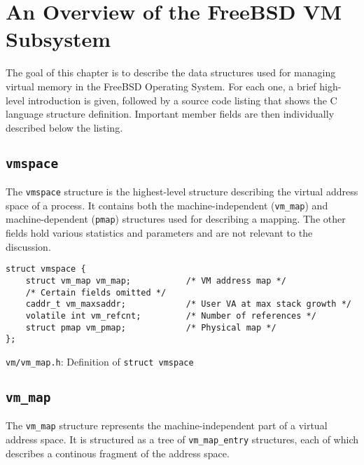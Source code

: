 \documentclass[shortabstract, english]{iithesis}
\begin{document}
\chapter{An Overview of the FreeBSD VM Subsystem}

The goal of this chapter is to describe the data structures used for managing
virtual memory in the FreeBSD Operating System. For each one, a brief high-level
introduction is given, followed by a source code listing that shows the C
language structure definition. Important member fields are then individually
described below the listing.

\section{\texttt{vmspace}}

The \texttt{vmspace} structure is the highest-level structure describing the
virtual address space of a process. It contains both the machine-independent
(\texttt{vm_map}) and machine-dependent (\texttt{pmap}) structures used for
describing a mapping. The other fields hold various statistics and parameters
and are not relevant to the discussion.

\begin{listing}[H]
\begin{verbatim}
struct vmspace {
    struct vm_map vm_map;           /* VM address map */
    /* Certain fields omitted */
    caddr_t vm_maxsaddr;            /* User VA at max stack growth */
    volatile int vm_refcnt;         /* Number of references */
    struct pmap vm_pmap;            /* Physical map */
};
\end{verbatim}
\caption{\texttt{vm/vm\_map.h}: Definition of \texttt{struct vmspace}}
\end{listing}

\section{\texttt{vm_map}}

The \texttt{vm_map} structure represents the machine-independent part of a
virtual address space. It is structured as a tree of \texttt{vm_map_entry}
structures, each of which describes a continous fragment of the address space.
\end{document}
